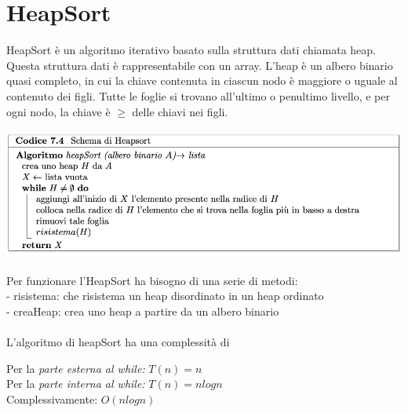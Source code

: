 \documentclass[11pt, oneside]{article}   	%
\begin{document}
\section*{HeapSort}
HeapSort è un algoritmo iterativo basato sulla struttura dati chiamata heap. Questa struttura dati è rappresentabile con un array. L'heap è un albero binario quasi completo, in cui la chiave contenuta in ciascun nodo è maggiore o uguale al contenuto dei figli. Tutte le foglie si trovano all'ultimo o penultimo livello, e per ogni nodo, la chiave è $\geq$ delle chiavi nei figli.
\begin{center}
\includegraphics[scale=0.6]{heapsort}
\end{center}
Per funzionare l'HeapSort ha bisogno di una serie di metodi:\\
- risistema: che risistema un heap disordinato in un heap ordinato\\
- creaHeap: crea uno heap a partire da un albero binario\\\\
L'algoritmo di heapSort ha una complessità di \begin{center}
Per la \emph{parte esterna al while:} $T(n) = n$ \\
Per la \emph{parte interna al while:} $T(n) = nlogn$\\
Complessivamente: $O(nlogn)$
\end{center}
\end{document}
